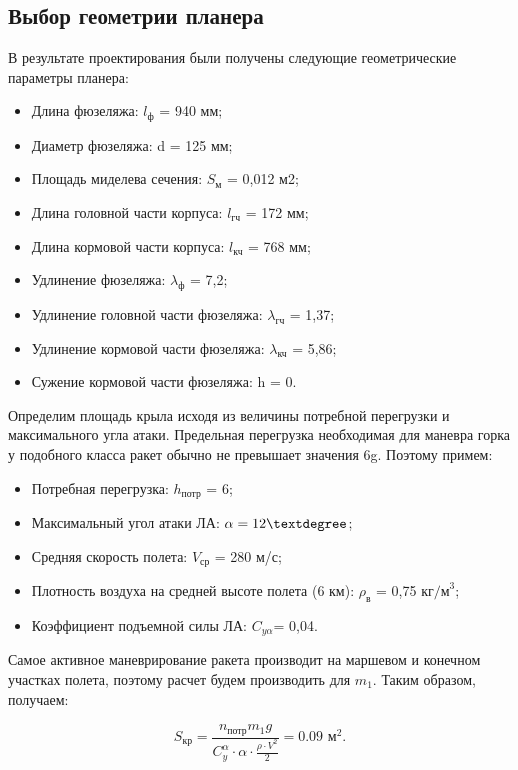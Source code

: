 \subsection{Выбор геометрии планера}
В результате проектирования были получены следующие геометрические параметры планера:
\begin{itemize}
	\item Длина фюзеляжа:						$l_\text{ф} $ = 940 мм;
	\item Диаметр фюзеляжа:						d = 125 мм;
	\item Площадь миделева сечения:				$S_\text{м} $ = 0,012 м2;
	\item Длина головной части корпуса:			$l_\text{гч} $ = 172 мм;
	\item Длина кормовой части корпуса:			$l_\text{кч} $ = 768 мм;
	\item Удлинение фюзеляжа:					$\lambda_\text{ф} $ = 7,2;
	\item Удлинение головной части фюзеляжа:	$\lambda_\text{гч} $ = 1,37;
	\item Удлинение кормовой части фюзеляжа:	$\lambda_\text{кч} $ = 5,86;
	\item Сужение кормовой части фюзеляжа:		h = 0.
\end{itemize}

Определим площадь крыла исходя из величины потребной перегрузки и максимального угла атаки. Предельная перегрузка необходимая для маневра горка у подобного класса ракет обычно не превышает значения 6g. Поэтому примем:
\begin{itemize}
	\item Потребная перегрузка:					            $h_\text{потр}$ = 6;
	\item Максимальный угол атаки ЛА:			                $\alpha = 12\textdegree$;
	\item Средняя скорость полета:				            $V_\text{ср}$ = 280 м/с;
	\item Плотность воздуха на средней высоте полета (6 км):  $\rho_\text{в}$ = 0,75 $\text{кг/м}^3$;
	\item Коэффициент подъемной силы ЛА:	                  	$C_{y\alpha} $= 0,04.
\end{itemize}

Самое активное маневрирование ракета производит на маршевом и конечном участках полета, поэтому расчет будем производить для $m_1$. Таким образом, получаем:

\[
S_\text{кр}=\frac{n_\text{потр}m_1g}{C_y^\alpha \cdot \alpha \cdot \frac{\rho \cdot V^2}{2}}=0.09 \text{ м}^2.
\]

